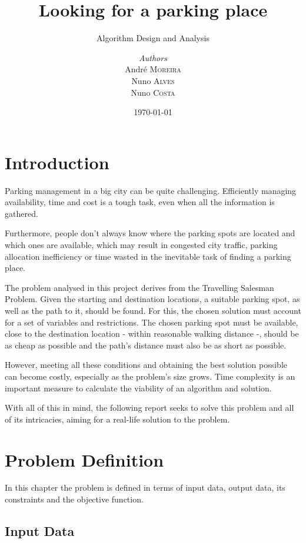 \documentclass[a4paper, 12pt]{report}
\institute{Faculty Of Engineering, University Of Porto}
\subtitle{Algorithm Design and Analysis}
\title{Looking for a parking place}
\author{\textit{Authors}\\André \textsc{Moreira}
        \\Nuno \textsc{Alves}
        \\Nuno \textsc{Costa}}
\date{\today}
\begin{document}
    \maketitle
    
    \romantableofcontents
    
    \chapter{Introduction} \label{intro}
    
    Parking management in a big city can be quite challenging. Efficiently managing availability, time and cost is a tough task, even when all the information is gathered.
    
    Furthermore, people don't always know where the parking spots are located and which ones are available, which may result in congested city traffic, parking allocation inefficiency or time wasted in the inevitable task of finding a parking place.
    
    The problem analysed in this project derives from the Travelling Salesman Problem. Given the starting and destination locations, a suitable parking spot, as well as the path to it, should be found. For this, the chosen solution must account for a set of variables and restrictions. The chosen parking spot must be available, close to the destination location - within reasonable walking distance -, should be as cheap as possible and the path's distance must also be as short as possible.
    
    However, meeting all these conditions and obtaining the best solution possible can become costly, especially as the problem's size grows. Time complexity is an important measure to calculate the viability of an algorithm and solution.
    
    With all of this in mind, the following report seeks to solve this problem and all of its intricacies, aiming for a real-life solution to the problem.
    
    \newpage
    
    
    \chapter{Problem Definition} \label{pdef}
    
    In this chapter the problem is defined in terms of input data, output data, its constraints and the objective function. 
    
    \section{Input Data} \label{idata}
    
\end{document}

